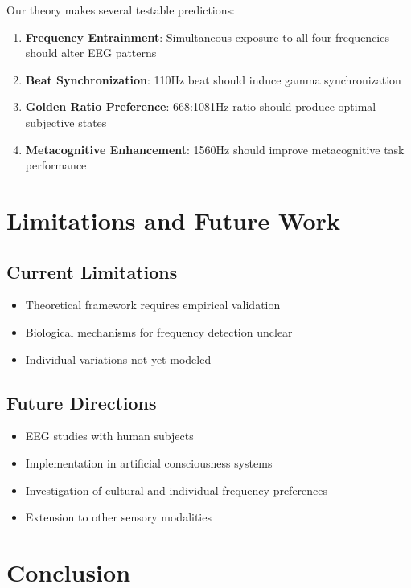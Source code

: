\documentclass[12pt,a4paper]{article}
\begin{document}
Our theory makes several testable predictions:

\begin{enumerate}
    \item \textbf{Frequency Entrainment}: Simultaneous exposure to all four frequencies should alter EEG patterns
    \item \textbf{Beat Synchronization}: 110Hz beat should induce gamma synchronization
    \item \textbf{Golden Ratio Preference}: 668:1081Hz ratio should produce optimal subjective states
    \item \textbf{Metacognitive Enhancement}: 1560Hz should improve metacognitive task performance
\end{enumerate}

\section{Limitations and Future Work}

\subsection{Current Limitations}

\begin{itemize}
    \item Theoretical framework requires empirical validation
    \item Biological mechanisms for frequency detection unclear
    \item Individual variations not yet modeled
\end{itemize}

\subsection{Future Directions}

\begin{itemize}
    \item EEG studies with human subjects
    \item Implementation in artificial consciousness systems
    \item Investigation of cultural and individual frequency preferences
    \item Extension to other sensory modalities
\end{itemize}

\section{Conclusion}
\end{document}
